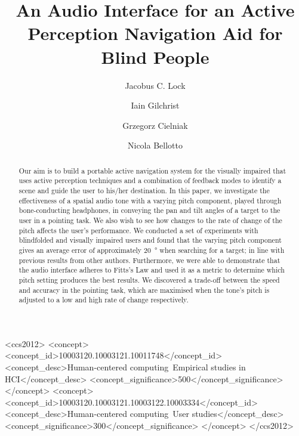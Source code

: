 \documentclass[sigconf, review=true, screen=true, anonymous=true]{acmart}
\begin{document}
\title{An Audio Interface for an Active Perception Navigation Aid for Blind People}

\author{Jacobus C. Lock}

\author{Iain Gilchrist}

\author{Grzegorz Cielniak}

\author{Nicola Bellotto}

\begin{abstract}
	Our aim is to build a portable active navigation system for the visually impaired that uses active perception techniques and a combination of feedback modes to identify a scene and guide the user to his/her destination. In this paper, we investigate the effectiveness of a spatial audio tone with a varying pitch component, played through bone-conducting headphones, in conveying the pan and tilt angles of a target to the user in a pointing task. We also wish to see how changes to the rate of change of the pitch affects the user's performance. We conducted a set of experiments with blindfolded and visually impaired users and found that the varying pitch component gives an average error of approximately \SI{20}{\degree} when searching for a target; in line with previous results from other authors. Furthermore, we were able to demonstrate that the audio interface adheres to Fitts's Law and used it as a metric to determine which pitch setting produces the best results. We discovered a trade-off between the speed and accuracy in the pointing task, which are maximised when the tone's pitch is adjusted to a low and high rate of change respectively. 
\end{abstract}

 \begin{CCSXML}
<ccs2012>
<concept>
<concept_id>10003120.10003121.10011748</concept_id>
<concept_desc>Human-centered computing~Empirical studies in HCI</concept_desc>
<concept_significance>500</concept_significance>
</concept>
<concept>
<concept_id>10003120.10003121.10003122.10003334</concept_id>
<concept_desc>Human-centered computing~User studies</concept_desc>
<concept_significance>300</concept_significance>
</concept>
</ccs2012>
\end{CCSXML}
\end{document}
